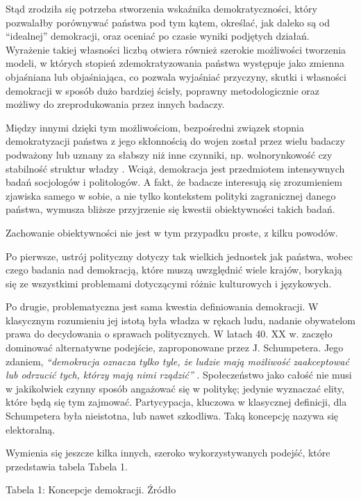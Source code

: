 \documentclass[12pt]{article}
\begin{document}
Stąd zrodziła się potrzeba stworzenia wskaźnika demokratyczności, który pozwalałby porównywać państwa pod tym kątem, określać, jak daleko są od ``idealnej'' demokracji, oraz oceniać po czasie wyniki podjętych działań. Wyrażenie takiej własności liczbą otwiera również szerokie możliwości tworzenia modeli, w których stopień zdemokratyzowania państwa występuje jako zmienna objaśniana lub objaśniająca, co pozwala wyjaśniać przyczyny, skutki i własności demokracji w sposób dużo bardziej ścisły, poprawny metodologicznie oraz możliwy do zreprodukowania przez innych badaczy.

Między innymi dzięki tym możliwościom, bezpośredni związek stopnia demokratyzacji państwa z jego skłonnością do wojen został przez wielu badaczy podważony lub uznany za słabszy niż inne czynniki, np. wolnorynkowość czy stabilność struktur władzy \citep{Doorenspleet}. Wciąż, demokracja jest przedmiotem intensywnych badań socjologów i politologów. A fakt, że badacze interesują się zrozumieniem zjawiska samego w sobie, a nie tylko kontekstem polityki zagranicznej danego państwa, wymusza bliższe przyjrzenie się kwestii obiektywności takich badań.

Zachowanie obiektywności nie jest w tym przypadku proste, z kilku powodów.

Po pierwsze, ustrój polityczny dotyczy tak wielkich jednostek jak państwa, wobec czego badania nad demokracją, które muszą uwzględnić wiele krajów, borykają się ze wszystkimi problemami dotyczącymi różnic kulturowych i językowych.

Po drugie, problematyczna jest sama kwestia definiowania demokracji. W klasycznym rozumieniu jej istotą była władza w rękach ludu, nadanie obywatelom prawa do decydowania o sprawach politycznych. W latach 40. XX w. zaczęło dominować alternatywne podejście, zaproponowane przez J. Schumpetera. Jego zdaniem, \emph{``demokracja oznacza tylko tyle, że ludzie mają możliwość zaakceptować lub odrzucić tych, którzy mają nimi rządzić''} \citep{Schumpeter}. Społeczeństwo jako całość nie musi w jakikolwiek czynny sposób angażować się w politykę; jedynie wyznaczać elity, które będą się tym zajmować. Partycypacja, kluczowa w klasycznej definicji, dla Schumpetera była nieistotna, lub nawet szkodliwa. Taką koncepcję nazywa się elektoralną.

Wymienia się jeszcze kilka innych, szeroko wykorzystywanych podejść, które przedstawia tabela Tabela 1.

Tabela 1: Koncepcje demokracji. Źródło \citep{Coppedge}
\end{document}

